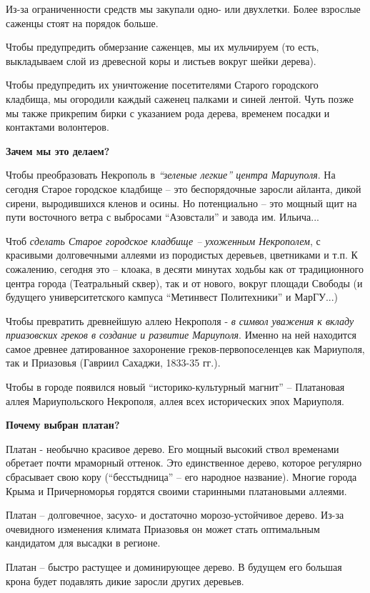 Из-за ограниченности средств мы закупали одно- или двухлетки. Более взрослые
саженцы стоят на порядок больше.

Чтобы предупредить обмерзание саженцев, мы их мульчируем (то есть, выкладываем
слой из древесной коры и листьев вокруг шейки дерева).

Чтобы предупредить их уничтожение посетителями Старого городского кладбища, мы
огородили каждый саженец палками и синей лентой. Чуть позже мы также прикрепим
бирки с указанием рода дерева, временем посадки и контактами волонтеров. 

\textbf{Зачем мы это делаем?}

Чтобы преобразовать Некрополь в \emph{\enquote{зеленые легкие} центра Мариуполя}. На сегодня
Старое городское кладбище – это беспорядочные заросли айланта, дикой сирени,
выродившихся кленов и осины. Но потенциально – это мощный щит на пути
восточного ветра с выбросами \enquote{Азовстали} и завода им. Ильича...

Чтоб \emph{сделать Старое городское кладбище – ухоженным Некрополем}, с красивыми
долговечными аллеями из породистых деревьев, цветниками и т.п. К сожалению,
сегодня это – клоака, в десяти минутах ходьбы как от традиционного центра
города (Театральный сквер), так и от нового, вокруг площади Свободы (и будущего
университетского кампуса \enquote{Метинвест Политехники} и МарГУ...)

Чтобы превратить древнейшую аллею Некрополя - \emph{в символ уважения к вкладу
приазовских греков в создание и развитие Мариуполя}. Именно на ней находится
самое древнее датированное захоронение греков-первопоселенцев как Мариуполя,
так и Приазовья (Гавриил Сахаджи, 1833-35 гг.).

Чтобы в городе появился новый \enquote{историко-культурный магнит} – Платановая
аллея Мариупольского Некрополя, аллея всех исторических эпох Мариуполя.

\textbf{Почему выбран платан?}

Платан - необычно красивое дерево. Его мощный высокий ствол временами обретает
почти мраморный оттенок. Это единственное дерево, которое регулярно сбрасывает
свою кору (\enquote{бесстыдница} – его народное название). Многие города Крыма и
Причерноморья гордятся своими старинными платановыми аллеями.

Платан – долговечное, засухо- и достаточно морозо-устойчивое дерево. Из-за
очевидного изменения климата Приазовья он может стать оптимальным кандидатом
для высадки в регионе.

Платан – быстро растущее и доминирующее дерево. В будущем его большая крона
будет подавлять дикие заросли других деревьев.


